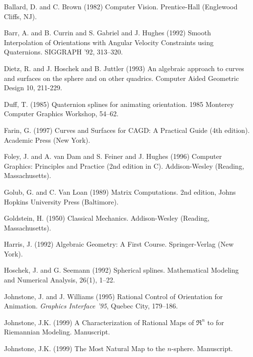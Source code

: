 
\begin{thebibliography}{Lozano-Perez 83}

Ballard, D. and C. Brown (1982)
Computer Vision.
Prentice-Hall (Englewood Cliffs, NJ).

Barr, A. and B. Currin and S. Gabriel and J. Hughes (1992)
Smooth Interpolation of Orientations with Angular Velocity Constraints
using Quaternions.
SIGGRAPH '92, 313--320.

Dietz, R. and J. Hoschek and B. Juttler (1993)
An algebraic approach to curves and surfaces on the sphere and
on other quadrics.
Computer Aided Geometric Design 10, 211-229.

Duff, T. (1985)
Quaternion splines for animating orientation.
1985 Monterey Computer Graphics Workshop, 54--62.

Farin, G. (1997)
Curves and Surfaces for CAGD: A Practical Guide (4th edition).
Academic Press (New York).

Foley, J. and A. van Dam and S. Feiner and J. Hughes (1996)
Computer Graphics: Principles and Practice (2nd edition in C).
Addison-Wesley (Reading, Massachusetts).

Golub, G. and C. Van Loan (1989)
Matrix Computations.
2nd edition, Johns Hopkins University Press (Baltimore).

Goldstein, H. (1950)
Classical Mechanics.
Addison-Wesley (Reading, Massachusetts).

Harris, J. (1992)
Algebraic Geometry: A First Course.
Springer-Verlag (New York).

Hoschek, J. and G. Seemann (1992)
Spherical splines.
Mathematical Modeling and Numerical Analysis, 26(1), 1--22.

Johnstone, J. and J. Williams (1995)
Rational Control of Orientation for Animation.
{\em Graphics Interface '95}, Quebec City, 179--186.

Johnstone, J.K. (1999)
A Characterization of Rational Maps of $\Re^n$ to 
for Riemannian Modeling.
Manuscript.

Johnstone, J.K. (1999)
The Most Natural Map to the $n$-sphere.
Manuscript.


\end{thebibliography}
